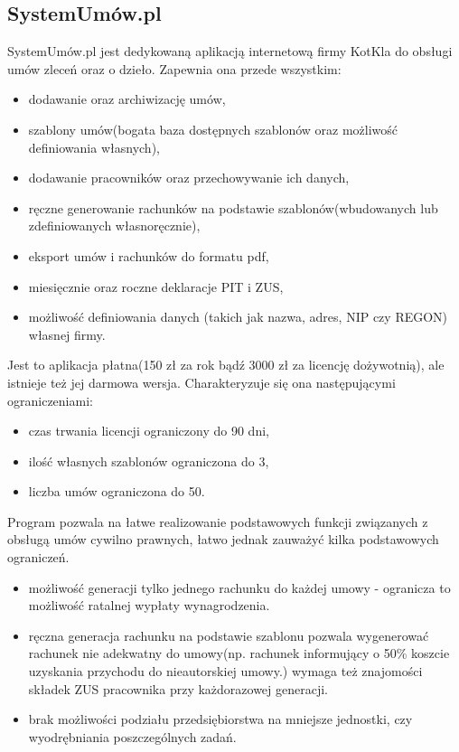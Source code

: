 \subsection[SystemUmów.pl][SystemUmów.pl]{SystemUmów.pl}
SystemUmów.pl jest dedykowaną aplikacją internetową firmy KotKla do obsługi umów zleceń oraz o dzieło. Zapewnia ona przede wszystkim:
\begin{itemize}
	\item dodawanie oraz archiwizację umów,
	\item szablony umów(bogata baza dostępnych szablonów oraz możliwość definiowania własnych),
	\item dodawanie pracowników oraz przechowywanie ich danych,
	\item ręczne generowanie rachunków na podstawie szablonów(wbudowanych lub zdefiniowanych własnoręcznie),
	\item eksport umów i rachunków do formatu pdf,
	\item miesięcznie oraz roczne deklaracje PIT i ZUS,
	\item możliwość definiowania danych (takich jak nazwa, adres, NIP czy REGON) własnej firmy.
\end{itemize}

Jest to aplikacja płatna(150 zł za rok bądź 3000 zł za licencję dożywotnią), ale istnieje też jej darmowa wersja. Charakteryzuje się ona następującymi ograniczeniami:
\begin{itemize}
	\item czas trwania licencji ograniczony do 90 dni,
	\item ilość własnych szablonów ograniczona do 3,
	\item liczba umów ograniczona do 50.
\end{itemize}
Program pozwala na łatwe realizowanie podstawowych funkcji związanych z obsługą umów cywilno prawnych, łatwo jednak zauważyć kilka podstawowych ograniczeń.
\begin{itemize}
	\item możliwość generacji tylko jednego rachunku do każdej umowy - ogranicza to możliwość ratalnej wypłaty wynagrodzenia.
	\item ręczna generacja rachunku na podstawie szablonu pozwala wygenerować rachunek nie adekwatny do umowy(np. rachunek informujący o 50\% koszcie uzyskania przychodu do nieautorskiej umowy.) wymaga też znajomości składek ZUS pracownika przy każdorazowej generacji.
	\item brak możliwości podziału przedsiębiorstwa na mniejsze jednostki, czy wyodrębniania poszczególnych zadań.
\end{itemize}

